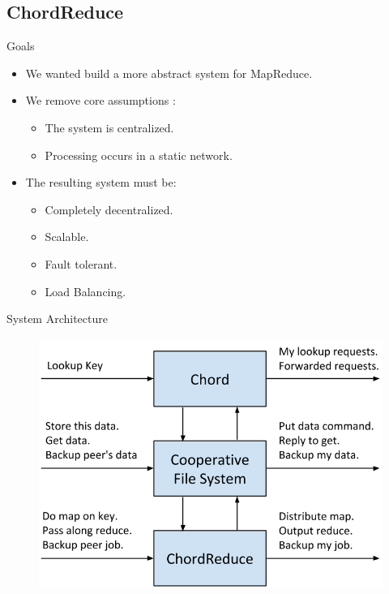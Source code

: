 \documentclass[11pt]{beamer}
\begin{document}
\subsection{ChordReduce}

\begin{frame}{Goals}

	\begin{itemize}
		\item We wanted build a more abstract system for MapReduce.
		\item We remove core assumptions \cite{hadoopAssumptions}:
		\begin{itemize}
			\item The system is centralized.
			\item Processing occurs in a static network.
		\end{itemize}
		\item The resulting system must be:
		\begin{itemize}
			\item Completely decentralized.
			\item Scalable.
			\item Fault tolerant.
			\item Load Balancing.
		\end{itemize}
	\end{itemize}

\end{frame}


%
%
%

\begin{frame}{System Architecture}
	\begin{figure}
	    \includegraphics[width=0.8\linewidth]{figs/CR_architecture}
	
	\end{figure}
\end{frame}
\end{document}
